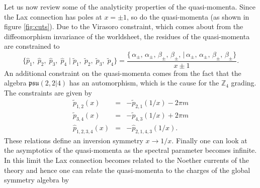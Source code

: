 Let us now review some of the analyticity properties of the quasi-momenta. 
Since the Lax connection has poles at $x = \pm 1$, so do the quasi-momenta (as shown in figure \ref{fig:cuts}). 
Due to the Virasoro constraint, which comes about from the diffeomorphism invariance of the worldsheet, the residues of the quasi-momenta are constrained to
\begin{equation}
	\label{eq:residue_sync}
	\{ \hat{p}_1, \; \hat{p}_2, \; \hat{p}_3, \; \hat{p}_4 \; | \; \tilde{p}_1, \; \tilde{p}_2, \; \tilde{p}_3, \; \tilde{p}_4 \} = \frac{\{ \, \alpha_{\pm}, \, \alpha_{\pm}, \, \beta_{\pm}, \, \beta_{\pm}, \, | \, \alpha_{\pm}, \, \alpha_{\pm}, \, \beta_{\pm}, \, \beta_{\pm} \}}{x \pm 1}.
\end{equation}
An additional constraint on the quasi-momenta comes from the fact that the algebra $\mathfrak{psu(2,2|4)}$ has an automorphism, which is the cause for the $\mathbb{Z}_4$ grading. 
The constraints are given by \cite{Gromov:2008ec}
\begin{eqnarray}
	\label{eq:quasi_inversion}
	\tilde{p}_{1,2}(x) & = & -\tilde{p}_{2,1}(1/x) - 2 \pi m \nonumber \\
	\tilde{p}_{3,4}(x) & = & -\tilde{p}_{4,3}(1/x) + 2 \pi m \nonumber \\
	\hat{p}_{1,2,3,4}(x) & = & -\hat{p}_{2,1,4,3}(1/x).
\end{eqnarray}
These relations define an inversion symmetry $x \rightarrow 1/x$. 
Finally one can look at the asymptotics of the quasi-momenta as the spectral parameter becomes infinite. In this limit the Lax connection becomes related to the Noether currents of the theory and hence one can relate the quasi-momenta to the charges of the global symmetry algebra by \cite{Arutyunov:2004yx,Beisert:2005bm}
